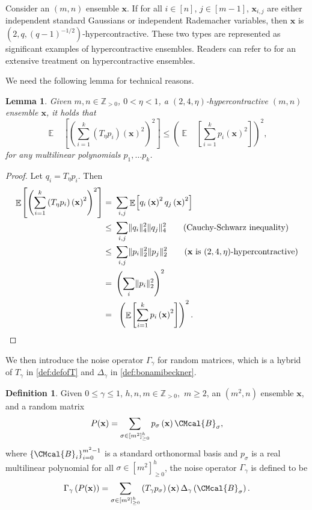 \documentclass[11pt]{article}
\def\B{\CMcal{B}}
\theoremstyle{plain}
\newtheorem{lemma}[theorem]{Lemma}
\theoremstyle{definition}
\newtheorem{definition}[theorem]{Definition}
\newcommand {\minusspace} {\: \! \!}
\newcommand {\Fn} [2] {\ensuremath{ #1 \minusspace \Br{ #2 } }}
\newcommand {\set} [1] {\ensuremath{ \left\lbrace #1 \right\rbrace }}
\newcommand {\br} [1] {\ensuremath{ \left( #1 \right) }}
\newcommand {\Br} [1] {\ensuremath{ \left[ #1 \right] }}
\DeclarePairedDelimiter{\norm}{\lVert}{\rVert}
\newcommand {\normsub} [2] {\ensuremath{ \norm{#1}_{#2} }}
\newcommand {\twonorm} [1] {\normsub{#1}{2}}
\DeclareMathOperator*{\bigE}{\mathbb{E}}
\newcommand {\expec} [2] {\Fn{\bigE_{\substack{#1}}}{#2}}
\newcommand{\posint}{{\mathbb Z}_{>0}}
\newcommand{\randx}{\ensuremath{\mathbf{x}}}
\newcommand{\1}{\mathbb{1}} %
\begin{document}
Consider an $(m,n)$ ensemble $\randx$. If for all $i\in[n]$, $j\in[m-1]$, $\randx_{i,j}$ are either independent standard Gaussians or independent Rademacher variables, then $\randx$ is $(2,q,(q-1)^{-1/2})$-hypercontractive. These two types are represented as significant examples of hypercontractive ensembles. Readers can refer to \cite{mossel2005noise} for an extensive treatment on hypercontractive ensembles.

We need the following lemma for technical reasons.
\begin{lemma}\label{lem:gausshyper}
	Given $m,n\in\posint$, $0<\eta<1$, a $(2,4,\eta)$-hypercontractive $(m,n)$ ensemble $\randx$, it holds that 
	\[\expec{ }{\br{\sum_{i=1}^k \br{T_{\eta}p_i}\br{\mathbf{x}}^2}^2}\leq\br{\expec{ }{\sum_{i=1}^kp_i\br{\mathbf{x}}^2}}^{2},\]
  for any multilinear polynomials $p_1,\ldots p_k$.
\end{lemma}



	
\begin{proof}
	Let $q_i= T_{\eta}p_i$. Then
	\begin{align*}
		\expec{ }{\br{\sum_{i=1}^k\br{T_{\eta}p_i}\br{\mathbf{x}}^2}^2}=~&\sum_{i, j}\expec{}{q_i\br{\mathbf{x}}^2q_j\br{\mathbf{x}}^2}\\
		\leq~&\sum_{i,j}\norm{q_i}_4^2\norm{q_j}_4^2\quad\quad\mbox{(Cauchy-Schwarz inequality)}\\
		\leq~&\sum_{i,j}\twonorm{p_i}^2\twonorm{p_j}^2\quad\quad\mbox{(\randx ~is $(2,4,\eta)$-hypercontractive)}\\
		=~&\br{\sum_i\twonorm{p_i}^2}^{2}\\
  =~&~\br{\expec{ }{\sum_{i=1}^kp_i\br{\mathbf{x}}^2}}^{2}.
	\end{align*}
\end{proof}

We then introduce the noise operator $\Gamma_{\gamma}$ for random matrices, which is a hybrid of $T_{\gamma}$ in \cref{def:defofT} and $\Delta_{\gamma}$ in \cref{def:bonamibeckner}.
	\begin{definition}\label{def:gamma}
	Given $0\leq\gamma\leq 1$, $h,n,m\in\posint,$ $m\geq 2$, an $(m^2,n)$ ensemble $\randx$, and a random matrix
 \begin{equation*}
	P(\randx)=\sum_{\sigma\in\Br{m^2}_{\geq0}^h}p_\sigma\br{\randx}\B_\sigma,
	\end{equation*}
	where $\set{\B_i}_{i=0}^{m^2-1}$ is a standard orthonormal basis and $p_\sigma$ is a real multilinear polynomial for all $\sigma\in\Br{m^2}_{\geq0}^h$, the noise operator $\Gamma_{\gamma}$ is defined to be	\[\Gamma_{\gamma}\br{P(\randx)}=\sum_{\sigma\in\Br{m^2}_{\geq0}^h}\br{T_\gamma p_\sigma}\br{\randx}\Delta_\gamma\br{\B_\sigma}.\]
\end{definition}
\end{document}
